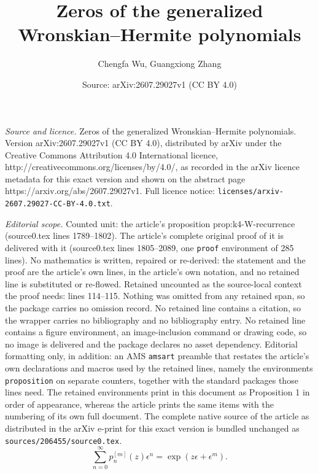 \documentclass[10pt,a4paper]{amsart}
\title{Zeros of the generalized Wronskian--Hermite polynomials}
\author{Chengfa Wu, Guangxiong Zhang}
\date{Source: arXiv:2607.29027v1 (CC BY 4.0)}
\begin{document}
\maketitle

\noindent\emph{Source and licence.} Zeros of the generalized Wronskian--Hermite polynomials. Version arXiv:2607.29027v1 (CC BY 4.0), distributed by arXiv under the Creative Commons Attribution 4.0 International licence, http://creativecommons.org/licenses/by/4.0/, as recorded in the arXiv licence metadata for this exact version and shown on the abstract page https://arxiv.org/abs/2607.29027v1. Full licence notice: \texttt{licenses/arxiv-2607.29027-CC-BY-4.0.txt}.\par\smallskip

\noindent\textit{Editorial scope.} Counted unit: the article's proposition prop:k4-W-recurrence (source0.tex lines 1789--1802). The article's complete original proof of it is delivered with it (source0.tex lines 1805--2089, one \texttt{proof} environment of 285 lines). No mathematics is written, repaired or re-derived: the statement and the proof are the article's own lines, in the article's own notation, and no retained line is substituted or re-flowed.  Retained uncounted as the source-local context the proof needs: lines 114--115.  Nothing was omitted from any retained span, so the package carries no omission record.  No retained line contains a citation, so the wrapper carries no bibliography and no bibliography entry.  No retained line contains a figure environment, an image-inclusion command or drawing code, so no image is delivered and the package declares no asset dependency.  Editorial formatting only, in addition: an AMS \texttt{amsart} preamble that restates the article's own declarations and macros used by the retained lines, namely the environments \texttt{proposition} on separate counters, together with the standard packages those lines need.  The retained environments print in this document as Proposition 1 in order of appearance, whereas the article prints the same items with the numbering of its own full document.  The complete native source of the article as distributed in the arXiv e-print for this exact version is bundled unchanged as \texttt{sources/206455/source0.tex}.
\begin{equation}\label{eq:p-generating-intro} \sum_{n=0}^{\infty}p_n^{[m]}(z)\epsilon^n = \exp(z\epsilon+\epsilon^m).
\end{equation} 
\end{document}

